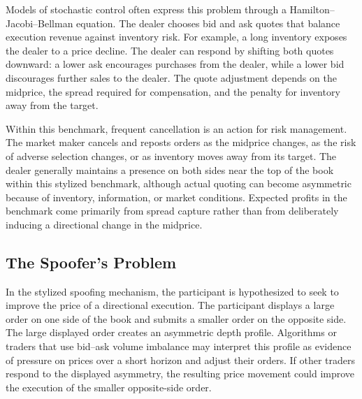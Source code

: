 \documentclass[11pt]{article}
\newenvironment{review}{\begingroup\color{blue}}{\endgroup}
\begin{document}
\begin{review}Models of stochastic control\end{review} often express this problem through a Hamilton--Jacobi--Bellman equation. The dealer chooses bid
and ask quotes that balance execution revenue against inventory risk. For example, a long inventory exposes the dealer to
a price decline. The dealer can respond by shifting both quotes downward: a lower ask encourages purchases from the
dealer, while a lower bid discourages further sales to the dealer. The quote adjustment depends on the midprice, the
spread required for compensation, and the penalty for inventory away from the target.

Within this benchmark, frequent cancellation is \begin{review}an action for risk management\end{review}. The market maker cancels and reposts orders as
the midprice changes, as \begin{review}the risk of adverse selection\end{review} changes, or as inventory moves away from its target. The dealer generally
maintains \begin{review}a presence on both sides\end{review} near the top of the book within this stylized benchmark, although actual quoting can become
asymmetric because of inventory, information, or market conditions. Expected profits in the benchmark come primarily from
spread capture rather than from deliberately inducing a directional change in the midprice.

\subsection{The Spoofer's Problem}
\label{subsec:spoofing}
In the stylized spoofing mechanism, the participant is hypothesized to seek to improve the price of a directional execution.
The participant displays a large order on one side of the book and submits a smaller order on the opposite side. The large
displayed order creates an asymmetric depth profile. Algorithms or traders that use bid--ask volume imbalance may interpret
this profile as evidence of \begin{review}pressure on prices over a short horizon\end{review} and adjust their orders. If other traders respond to the displayed
asymmetry, the resulting price movement could improve the execution of the smaller opposite-side order.
\end{document}
